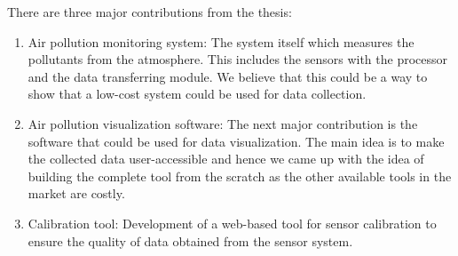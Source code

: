 There are three major contributions from the thesis:
\begin{enumerate}
  
    \item Air pollution monitoring system: The system itself which measures the pollutants from the atmosphere. This includes the sensors with the processor and the data transferring module. We believe that this could be a way to show that a low-cost system could be used for data collection.
    
    \item  Air pollution visualization software: The next major contribution is the software that could be used for data visualization. The main idea is to make the collected data user-accessible and hence we came up with the idea of building the complete tool from the scratch as the other available tools in the market are costly. 
    
    \item Calibration tool: Development of a web-based tool for sensor calibration to ensure the quality of data obtained from the sensor system.
    
  
\end{enumerate}
